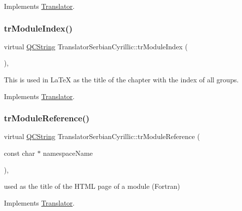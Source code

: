Implements \mbox{\hyperlink{class_translator}{Translator}}.

\mbox{\label{class_translator_serbian_cyrillic_aa0b9a6c8751a995d2ebf206758ca79dd}} 
\subsubsection{\texorpdfstring{trModuleIndex()}{trModuleIndex()}}
{\footnotesize\ttfamily virtual \mbox{\hyperlink{class_q_c_string}{Q\+C\+String}} Translator\+Serbian\+Cyrillic\+::tr\+Module\+Index (\begin{DoxyParamCaption}{ }\end{DoxyParamCaption})\hspace{0.3cm}{\ttfamily [inline]}, {\ttfamily [virtual]}}

This is used in La\+TeX as the title of the chapter with the index of all groups. 

Implements \mbox{\hyperlink{class_translator}{Translator}}.

\mbox{\label{class_translator_serbian_cyrillic_aee6e0a49dafe54960c2dbc685cb33f60}} 
\subsubsection{\texorpdfstring{trModuleReference()}{trModuleReference()}}
{\footnotesize\ttfamily virtual \mbox{\hyperlink{class_q_c_string}{Q\+C\+String}} Translator\+Serbian\+Cyrillic\+::tr\+Module\+Reference (\begin{DoxyParamCaption}\item[{const char $\ast$}]{namespace\+Name }\end{DoxyParamCaption})\hspace{0.3cm}{\ttfamily [inline]}, {\ttfamily [virtual]}}

used as the title of the H\+T\+ML page of a module (Fortran) 

Implements \mbox{\hyperlink{class_translator}{Translator}}.

\mbox{\label{class_translator_serbian_cyrillic_aa9a9fb6c26cce5d53f68fdab99ced23f}} 
